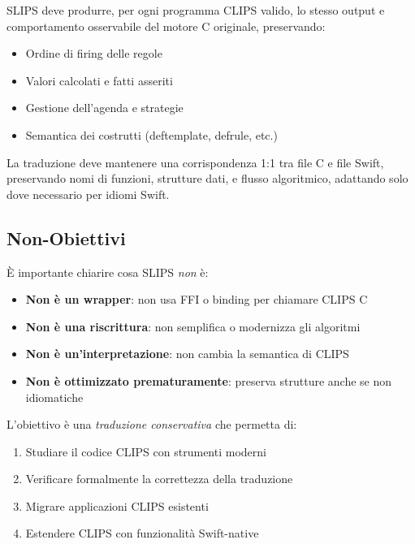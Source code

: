 \begin{definizione}
SLIPS deve produrre, per ogni programma CLIPS valido, lo stesso output e comportamento osservabile del motore C originale, preservando:
\begin{itemize}
\item Ordine di firing delle regole
\item Valori calcolati e fatti asseriti
\item Gestione dell'agenda e strategie
\item Semantica dei costrutti (deftemplate, defrule, etc.)
\end{itemize}
\end{definizione}

\begin{definizione}
La traduzione deve mantenere una corrispondenza 1:1 tra file C e file Swift, preservando nomi di funzioni, strutture dati, e flusso algoritmico, adattando solo dove necessario per idiomi Swift.
\end{definizione}

\subsection{Non-Obiettivi}

È importante chiarire cosa SLIPS \textit{non} è:

\begin{itemize}
\item \textbf{Non è un wrapper}: non usa FFI o binding per chiamare CLIPS C
\item \textbf{Non è una riscrittura}: non semplifica o modernizza gli algoritmi
\item \textbf{Non è un'interpretazione}: non cambia la semantica di CLIPS
\item \textbf{Non è ottimizzato prematuramente}: preserva strutture anche se non idiomatiche
\end{itemize}

L'obiettivo è una \textit{traduzione conservativa} che permetta di:
\begin{enumerate}
\item Studiare il codice CLIPS con strumenti moderni
\item Verificare formalmente la correttezza della traduzione
\item Migrare applicazioni CLIPS esistenti
\item Estendere CLIPS con funzionalità Swift-native
\end{enumerate}

